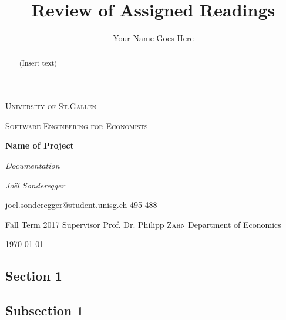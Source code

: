 \documentclass[a4paper,12pt]{article}
\title{Review of Assigned Readings}
\author{Your Name Goes Here}
\begin{document}
    \begin{titlepage}
        \centering
        {\scshape\LARGE University of St.Gallen \par}
        \vspace{1cm}
        {\scshape\Large Software Engineering for Economists \par}
        \vspace{1.3cm}
        {\huge\bfseries Name of Project  \par}
        {\Large\itshape Documentation\par}
        \vspace{3cm}
        {\Large\itshape Joël Sonderegger\par}
        \begin{spacing}{1.2}
        joel.sonderegger{@}student.unisg.ch-495-488\linebreak
        
        \vspace{1cm}
        Fall Term 2017
        \vfill
        Supervisor
        \linebreak
        Prof. Dr. Philipp \textsc{Zahn}
        \linebreak
        Department of Economics
        \end{spacing}
    
        \vfill
    
     {\large \today\par}
    
    \end{titlepage}
    \begin{abstract}
    \begin{spacing}{1.5}
    
  (Insert text)

    \end{spacing}
    
    \end{abstract}

    \clearpage
    \tableofcontents
    
    \clearpage
    
    \listoffigures
    
    \clearpage

\begin{spacing}{1.2}
\cleardoublepage{}
\section{Section 1}

\subsection{Subsection 1}


\end{spacing}
\clearpage

\printbibliography
\end{document}
